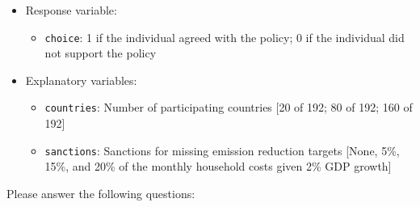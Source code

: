 \documentclass[12pt,letterpaper]{article}
\begin{document}
\begin{itemize}
	\item
	Response variable: 
	\begin{itemize}
		\item \texttt{choice}: 1 if the individual agreed with the policy; 0 if the individual did not support the policy
	\end{itemize}
	\item
	Explanatory variables: 
	\begin{itemize}
		\item
		\texttt{countries}: Number of participating countries [20 of 192; 80 of 192; 160 of 192]
		\item
		\texttt{sanctions}: Sanctions for missing emission reduction targets [None, 5\%, 15\%, and 20\% of the monthly household costs given 2\% GDP growth]
		
	\end{itemize}
	
\end{itemize}

\newpage
\noindent Please answer the following questions:
\end{document}

